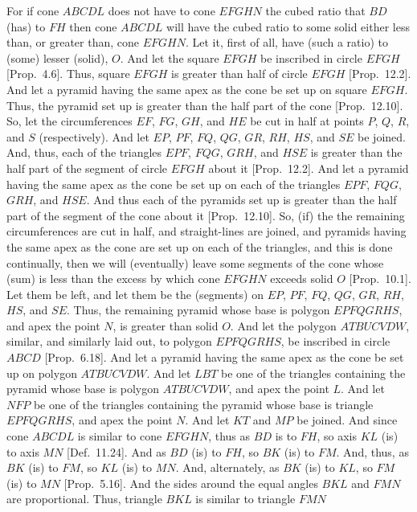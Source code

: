 \begin{Parallel}{}{}
{For if cone $ABCDL$ does not have to cone $EFGHN$ the cubed ratio that $BD$ (has) to $FH$ then cone $ABCDL$ will  have the
cubed ratio to some solid either less than, or greater than, cone $EFGHN$. Let it, first of all, have (such a  ratio) to
(some) lesser (solid), $O$. And let the square $EFGH$ be inscribed in circle $EFGH$ [Prop.~4.6]. 
Thus, square $EFGH$ is greater than half of circle $EFGH$ [Prop.~12.2]. And let a pyramid having the
same apex as the cone be set up on square $EFGH$. Thus, the pyramid set up is greater than the half part of the cone [Prop.~12.10]. So, let the circumferences $EF$, $FG$, $GH$, and $HE$ be cut in half at points $P$, $Q$, $R$, and $S$ (respectively). 
And let $EP$, $PF$, $FQ$, $QG$, $GR$, $RH$, $HS$, and $SE$ be
joined. And, thus, each of the triangles $EPF$, $FQG$, $GRH$, and $HSE$
is greater than the half part of the segment of circle $EFGH$ about it  [Prop.~12.2]. And let a pyramid having the same apex as
the cone be set up on each of the triangles $EPF$, $FQG$, $GRH$, and $HSE$. And thus each of the pyramids set up is greater than
the half part of the segment of the cone about it [Prop.~12.10]. So, (if) the the remaining circumferences are cut in half, and 
straight-lines are joined, and pyramids having the same apex as the cone are set up on each of 
the triangles, and this is done continually, then we will (eventually) leave some segments of the 
cone whose (sum) is less than the excess by which cone $EFGHN$ exceeds solid $O$ [Prop.~10.1].
Let them be left, and let them be the (segments) on $EP$, $PF$, $FQ$, $QG$, $GR$, $RH$, $HS$, and $SE$. Thus, the remaining
pyramid whose base is polygon $EPFQGRHS$, and apex the point $N$, is greater than solid $O$.  And let the polygon
$ATBUCVDW$, similar, and similarly laid out, to polygon $EPFQGRHS$, be inscribed in circle $ABCD$ [Prop.~6.18].
And let a pyramid having the same apex as the cone be set up on polygon $ATBUCVDW$. And let $LBT$ be one
of the triangles containing the pyramid whose base is polygon $ATBUCVDW$, and apex the point $L$. And let
$NFP$ be one of the triangles containing the pyramid whose base is triangle $EPFQGRHS$, and apex the point
$N$. And let $KT$ and $MP$ be joined. And since cone $ABCDL$ is similar to cone $EFGHN$, thus as
$BD$ is to $FH$, so axis $KL$ (is) to axis $MN$ [Def.~11.24].  And as $BD$ (is) to
$FH$, so $BK$ (is) to $FM$. And, thus, as $BK$ (is) to $FM$, so $KL$ (is) to $MN$. And, alternately, as $BK$ (is)
to $KL$, so $FM$ (is) to $MN$ [Prop.~5.16]. And the sides around the equal angles $BKL$ and
$FMN$ are proportional. Thus, triangle $BKL$ is similar to triangle $FMN$
}
\end{Parallel}
